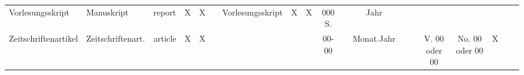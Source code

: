 \begin{sidewaystable}
\begin{table} [H]
\begin{center}
{\begin{tabularx}{230 mm}{ l l l | c c c c c c c c c c c c c c l  c }
Vorlesungsskript \cite{menn_langzeit-vorgange_1977} &Manuskript&report&X&X&& {\tiny Vorlesungsskript } &X&X&000 S.&&Jahr&&&&&\\
Zeitschriftenartikel \cite{rusch_researches_1960} \cite{trost_auswirkungen_1967} &Zeitschriftenart.&article&X&X&&&&&00-00&&Monat.Jahr&&& {\tiny V. 00 oder 00 } & {\tiny No. 00 oder 00 } &X\\
\hline
\end{tabularx}
}
\end{center}   
\label{tabLiteraturstellen}
\end{table}
\end{sidewaystable}